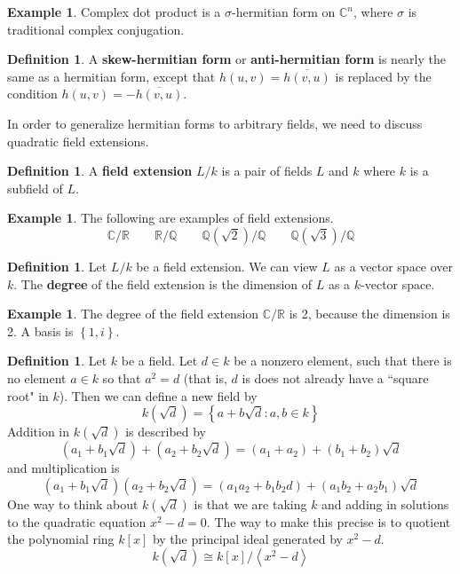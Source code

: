 \documentclass[12pt]{article}
\theoremstyle{definition}
\newtheorem{definition}[theorem]{Definition}
\newtheorem{example}[theorem]{Example}
\numberwithin{theorem}{subsection}
\newcommand{\Q}{\mathbb{Q}}
\newcommand{\R}{\mathbb{R}}
\newcommand{\C}{\mathbb{C}}
\newcommand{\sig}{\sigma}
\newcommand{\lp}{\left(}
\newcommand{\rp}{\right)}
\newcommand{\lb}{\left\{}
\newcommand{\rb}{\right\}}
\newcommand{\la}{\left\langle}
\newcommand{\ra}{\right\rangle}
\newcommand{\tbf}{\textbf}
\newcommand{\noi}{\noindent}
\newcommand{\ov}{\overline}
\newcommand{\iso}{\cong}
\begin{document}
\begin{example}
Complex dot product is a $\sig$-hermitian form on $\C^n$, where $\sig$ is traditional complex conjugation.
\end{example}

\begin{definition}
A \tbf{skew-hermitian form} or \tbf{anti-hermitian form} is nearly the same as a hermitian form, except that $h(u,v) = \ov{h(v,u)}$ is replaced by the condition $h(u,v) = - \ov{h(v,u)}$.
\end{definition}


\noi In order to generalize hermitian forms to arbitrary fields, we need to discuss quadratic field extensions.

\begin{definition}
A \tbf{field extension} $L/k$ is a pair of fields $L$ and $k$ where $k$ is a subfield of $L$.
\end{definition}

\begin{example}
The following are examples of field extensions.
\[
	\C/\R \qquad \R/\Q \qquad \Q ( \sqrt{2} ) /\Q \qquad \Q(\sqrt{3})/\Q
\]
\end{example}

\begin{definition}
Let $L/k$ be a field extension. We can view $L$ as a vector space over $k$. The \tbf{degree} of the field extension is the dimension of $L$ as a $k$-vector space.
\end{definition}

\begin{example}
The degree of the field extension $\C/\R$ is 2, because the dimension is 2. A basis is $\lb 1, i \rb$.
\end{example}

\begin{definition}
Let $k$ be a field. Let $d \in k$ be a nonzero element, such that there is no element $a \in k$ so that $a^2 = d$ (that is, $d$ is does not already have a ``square root" in $k$). Then we can define a new field by
\[
	k \lp \sqrt{d} \rp = \lb a+b \sqrt{d} : a, b \in k \rb
\]
Addition in $k\lp \sqrt{d} \rp$ is described by
\[
	(a_1+b_1 \sqrt{d}) + (a_2 + b_2 \sqrt{d}) = (a_1 + a_2) + (b_1 + b_2) \sqrt{d}
\]
and multiplication is
\[
	(a_1 + b_1 \sqrt{d}) (a_2 + b_2 \sqrt{d}) = (a_1 a_2 + b_1 b_2 d) + (a_1 b_2 + a_2 b_1) \sqrt{d}
\]
One way to think about $k \lp \sqrt{d} \rp$ is that we are taking $k$ and adding in solutions to the quadratic equation $x^2 - d = 0$. The way to make this precise is to quotient the polynomial ring $k[x]$ by the principal ideal generated by $x^2 - d$.
\[
	k\lp \sqrt{d} \rp \iso k[x] / \la x^2 - d \ra
\]
\end{definition}
\end{document}
